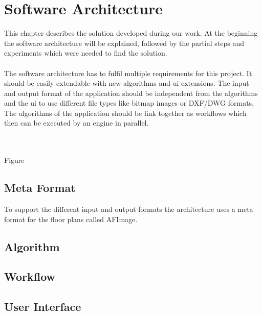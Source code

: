 \section{Software Architecture}
This chapter describes the solution developed during our work. At the beginning the software architecture will be explained, followed by the partial steps and experiments which were needed to find the solution.
\\\\
The software architecture has to fulfil multiple requirements for this project. It should be easily extendable with new algorithms and ui extensions. The input and output format of the application should be independent from the algorithms and the ui to use different file types like bitmap images or \Gls{DXF}/\Gls{DWG} formats. The algorithms of the application should be link together as workflows which then can be executed by an engine in parallel.

\\\\
Figure



\subsection{Meta Format}
To support the different input and output formats the architecture uses a meta format for the
floor plans called AFImage.
\subsection{Algorithm}
\subsection{Workflow}

\subsection{User Interface}
